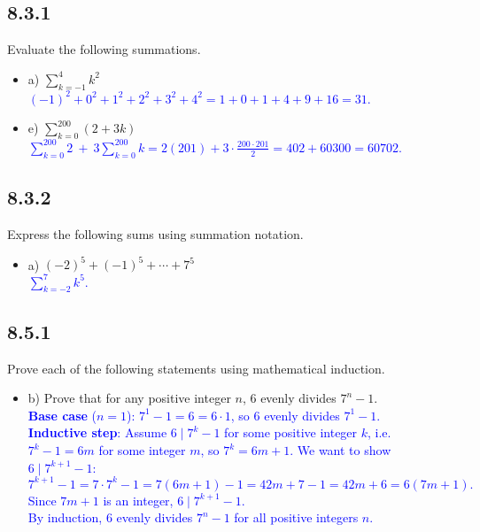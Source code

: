 \documentclass{article}
\begin{document}
\subsection*{8.3.1}
Evaluate the following summations.
\begin{itemize}
    \item a) $\displaystyle\sum_{k=-1}^{4} k^2$ \\
    \textcolor{blue}{$(-1)^2 + 0^2 + 1^2 + 2^2 + 3^2 + 4^2 = 1 + 0 + 1 + 4 + 9 + 16 = 31$.}
    \item e) $\displaystyle\sum_{k=0}^{200} (2 + 3k)$ \\
    \textcolor{blue}{$\displaystyle\sum_{k=0}^{200} 2\ +\ 3\sum_{k=0}^{200} k = 2(201) + 3\cdot\frac{200\cdot 201}{2} = 402 + 60300 = 60702$.}
\end{itemize}

\subsection*{8.3.2}
Express the following sums using summation notation.
\begin{itemize}
    \item a) $(-2)^5 + (-1)^5 + \cdots + 7^5$ \\
    \textcolor{blue}{$\displaystyle\sum_{k=-2}^{7} k^5$.}
\end{itemize}

\subsection*{8.5.1}
Prove each of the following statements using mathematical induction.
\begin{itemize}
    \item b) Prove that for any positive integer $n$, 6 evenly divides $7^n - 1$. \\
    \textcolor{blue}{
    \textbf{Base case} ($n = 1$): $7^1 - 1 = 6 = 6 \cdot 1$, so 6 evenly divides $7^1 - 1$. \\[4pt]
    \textbf{Inductive step}: Assume $6 \mid 7^k - 1$ for some positive integer $k$, i.e.\ $7^k - 1 = 6m$ for some integer $m$, so $7^k = 6m + 1$. We want to show $6 \mid 7^{k+1} - 1$:
    \[
        7^{k+1} - 1 = 7 \cdot 7^k - 1 = 7(6m + 1) - 1 = 42m + 7 - 1 = 42m + 6 = 6(7m + 1).
    \]
    Since $7m + 1$ is an integer, $6 \mid 7^{k+1} - 1$. \\[4pt]
    By induction, 6 evenly divides $7^n - 1$ for all positive integers $n$.
    }
\end{itemize}
\end{document}
